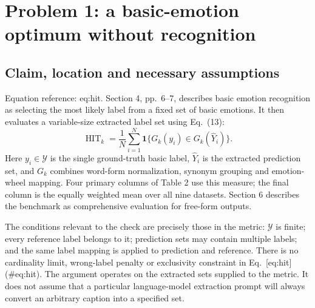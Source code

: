 \documentclass[10pt]{article}
\begin{document}
\section*{Problem 1: a basic-emotion optimum without recognition}
\subsection*{Claim, location and necessary assumptions}
Equation reference: eq:hit. Section 4, pp. 6–7, describes basic emotion recognition as selecting the most likely label from a fixed set of basic emotions. It then evaluates a variable-size extracted label set using Eq. (13): \[
 \operatorname{HIT}_k=\frac1N\sum_{i=1}^{N}
 \mathbf{1}\{G_k(y_i)\in G_k(\widehat Y_i)\}.\] Here \(y_i\in\mathcal Y\) is the single ground-truth basic label, \(\widehat Y_i\) is the extracted prediction set, and \(G_k\) combines word-form normalization, synonym grouping and emotion-wheel mapping. Four primary columns of Table 2 use this measure; the final column is the equally weighted mean over all nine datasets. Section 6 describes the benchmark as comprehensive evaluation for free-form outputs.\par
The conditions relevant to the check are precisely those in the metric: \(\mathcal Y\) is finite; every reference label belongs to it; prediction sets may contain multiple labels; and the same label mapping is applied to prediction and reference. There is no cardinality limit, wrong-label penalty or exclusivity constraint in Eq. [eq:hit] (\#eq:hit). The argument operates on the extracted sets supplied to the metric. It does not assume that a particular language-model extraction prompt will always convert an arbitrary caption into a specified set.\par
\end{document}
